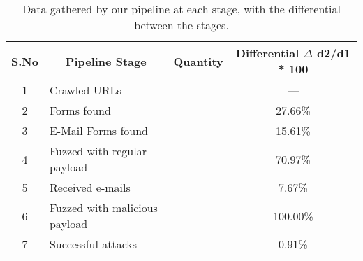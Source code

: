\begin{table}[!htbp]
	\centering
	\begin{tabular}{|c|l|c|c|}
		\hline
		\multicolumn{1}{|c|}{\textbf{S.No}} &
		\multicolumn{1}{c|}{\textbf{Pipeline Stage}} &
		\multicolumn{1}{p{3cm}|}{\centering \textbf{Quantity}} &
		\multicolumn{1}{p{2.8cm}|}{\centering \textbf{Differential}
		$\Delta$ d2/d1 * 100}\\
		\hline
		1 &  Crawled URLs  & \urls &  --- \\
		\hline
		2 &  Forms found  & \forms & 27.66\% \\
		\hline
		3 &  E-Mail Forms found  & \emailforms & 15.61\% \\
		\hline
		4 &  Fuzzed with regular payload  & \fuzzed & 70.97\% \\
		\hline
		5 &  Received e-mails  & \recd & 7.67\% \\
		\hline
		6 &  Fuzzed with malicious payload  & \malfuzzed & 100.00\% \\
		\hline
		7 &  Successful attacks  & \success & 0.91\% \\
		\hline

	\end{tabular}
	\caption[Data gathered by our pipeline]{Data gathered by our pipeline at each stage, with the differential between the stages.}
	\label{tab:pipeline}
\end{table}